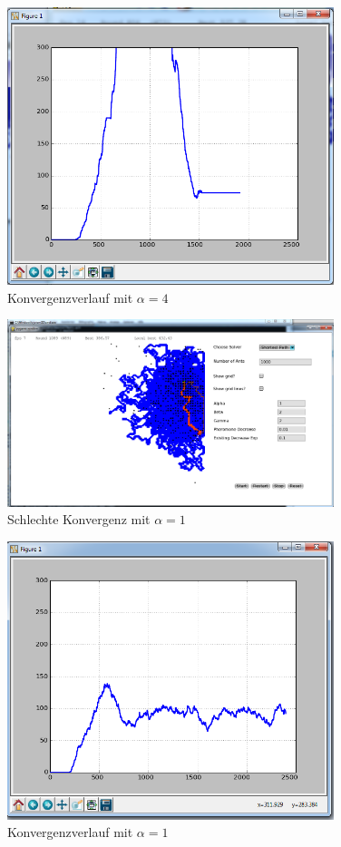 \begin{figure}[h]
  \centering
	\includegraphics [width=0.85\textwidth]{images/screenshots/good1_chart.png} 
	\caption{Konvergenzverlauf mit $\alpha = 4$}
\end{figure}

\begin{figure}[h]
  \centering
	\includegraphics [width=0.85\textwidth]{images/screenshots/bad1.png} 
	\caption{Schlechte Konvergenz mit $\alpha = 1$}
\end{figure}

\begin{figure}[h]
  \centering
	\includegraphics [width=0.85\textwidth]{images/screenshots/bad1_chart.png} 
	\caption{Konvergenzverlauf mit $\alpha = 1$}
\end{figure}

